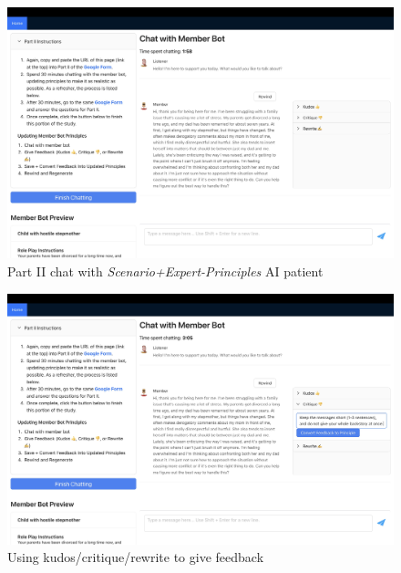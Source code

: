 \documentclass[11pt]{article}
\begin{document}
\begin{figure}[ht]
    \centering
    \includegraphics[width=\textwidth]{Study Screenshots/Screen10.jpeg}
    \caption{Part II chat with \textit{Scenario+Expert-Principles} AI patient}
    \label{fig:screen10}
\end{figure}

\begin{figure}[ht]
    \centering
    \includegraphics[width=\textwidth]{Study Screenshots/Screen11.jpeg}
    \caption{Using kudos/critique/rewrite to give feedback}
    \label{fig:screen11}
\end{figure}
\end{document}
